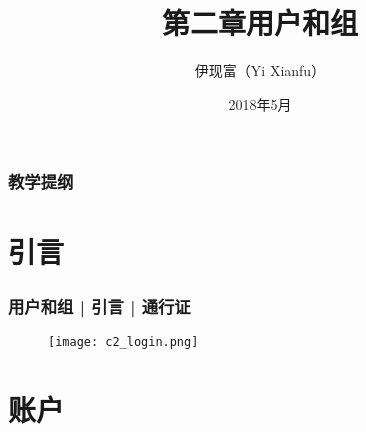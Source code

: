 



\title[用户和组]{第二章\quad 用户和组}
\author[Yixf]{伊现富（Yi Xianfu）}
\date{2018年5月}


\begin{frame}
  \titlepage
\end{frame}

\begin{frame}[plain,label=current]
  \frametitle{教学提纲}
  \setcounter{tocdepth}{3}
  \begin{multicols}{2}
    \tableofcontents
  \end{multicols}
\end{frame}

\section{引言}
\begin{frame}
  \frametitle{用户和组 | 引言 | 通行证}
  \begin{figure}
    \centering
    \texttt{[image: c2\_login.png]}
  \end{figure}
\end{frame}

\section{账户}
